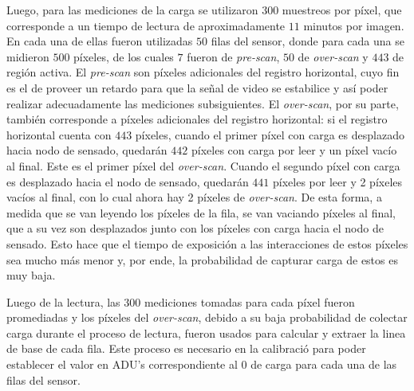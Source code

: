 Luego, para las mediciones de la carga se utilizaron $300$ muestreos por píxel, que corresponde a un tiempo de lectura de aproximadamente $11$ minutos por imagen. En cada una de ellas fueron utilizadas $50$ filas del sensor, donde para cada una se midieron $500$ píxeles, de los cuales $7$ fueron de \textit{pre-scan}, $50$ de \textit{over-scan} y $443$ de región activa. El \textit{pre-scan} son píxeles adicionales del registro horizontal, cuyo fin es el de proveer un retardo para que la señal de video se estabilice y así poder realizar adecuadamente las mediciones subsiguientes. El \textit{over-scan}, por su parte, también corresponde a píxeles adicionales del registro horizontal: si el registro horizontal cuenta con $443$ píxeles, cuando el primer píxel con carga es desplazado hacia nodo de sensado, quedarán $442$ píxeles con carga por leer y un píxel vacío al final. Este es el primer píxel del \textit{over-scan}. Cuando el segundo píxel con carga es desplazado hacia el nodo de sensado, quedarán $441$ píxeles por leer y 2 píxeles vacíos al final, con lo cual ahora hay 2 píxeles de \textit{over-scan}. De esta forma, a medida que se van leyendo los píxeles de la fila, se van vaciando píxeles al final, que a su vez son desplazados junto con los píxeles con carga hacia el nodo de sensado. Esto hace que el tiempo de exposición a las interacciones de estos píxeles sea mucho más menor y, por ende, la probabilidad de capturar carga de estos es muy baja.


Luego de la lectura, las $300$ mediciones tomadas para cada píxel fueron promediadas y los píxeles del \textit{over-scan}, debido a su baja probabilidad de colectar carga durante el proceso de lectura, fueron usados para calcular y extraer la linea de base de cada fila. Este proceso es necesario en la calibració para poder establecer el valor en ADU's correspondiente al $0$ de carga para cada una de las filas del sensor. 


